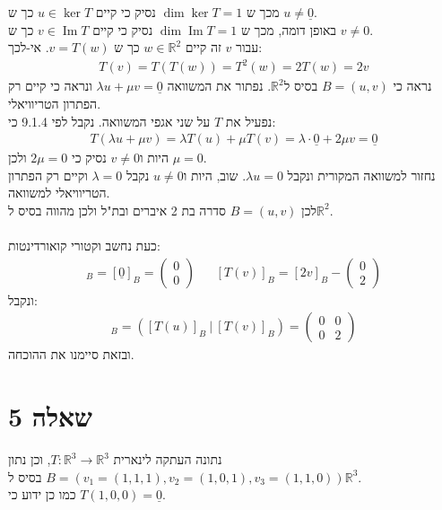 \documentclass{article}
\DeclareMathOperator\Image{Im}
\def\reals{\mathbb{R}}
\def\zerovec{\underline{0}}
\begin{document}
מכך ש $\dim \ker T=1$ נסיק כי קיים $u\in \ker T$ כך ש $u\ne\zerovec$. \\
באופן דומה, מכך ש $\dim\Image T=1$ נסיק כי קיים $v\in \Image T$ כך ש $v\ne 0$. \\
עבור $v$ זה קיים $w\in \reals^2$ כך ש $v=T(w)$. אי-לכך:
\begin{align*}
    T(v)=T(T(w))=T^2(w)=2T(w)=2v
\end{align*}
נראה כי $B=(u,v)$ בסיס ל$\reals^2$. נפתור את המשוואה $\lambda u+\mu v=\zerovec$ ונראה כי קיים רק הפתרון הטריוויאלי.\\
נפעיל את $T$ על שני אגפי המשוואה. נקבל לפי 9.1.4 כי:
\begin{align*}
    T(\lambda u+\mu v)=\lambda T(u)+\mu T(v)=\lambda \cdot \zerovec + 2\mu v = \zerovec
\end{align*}
היות ו$v\ne 0$ נסיק כי $2\mu =0$ ולכן $\mu=0$.\\
נחזור למשוואה המקורית ונקבל $\lambda u=0$. שוב, היות ו$u\ne0$ נקבל $\lambda=0$ וקיים רק הפתרון הטריוויאלי למשוואה.\\
לכן $B=(u,v)$ סדרה בת 2 איברים ובת"ל ולכן מהווה בסיס ל$\reals^2$.\\\\
כעת נחשב וקטורי קואורדינטות:
\begin{align*}
    [T(u)]_B=[\zerovec]_B=\begin{pmatrix}
        0 \\
        0
    \end{pmatrix}
     &  &
    [T(v)]_B=[2v]_B-\begin{pmatrix}
        0 \\
        2
    \end{pmatrix}
\end{align*}
ונקבל:
\begin{align*}
    [T]_B=([T(u)]_B \ | \ [T(v)]_B)=\begin{pmatrix}
        0 & 0 \\
        0 & 2
    \end{pmatrix}
\end{align*}
ובזאת סיימנו את ההוכחה.

\pagebreak

\section*{שאלה 5}

נתונה העתקה לינארית $T: \reals^3\rightarrow \reals^3$, וכן נתון $B=(v_1=(1,1,1), v_2=(1,0,1), v_3=(1,1,0))$
בסיס ל$\reals^3$.\\
כמו כן ידוע כי $T(1,0,0)=\zerovec$.
\end{document}
